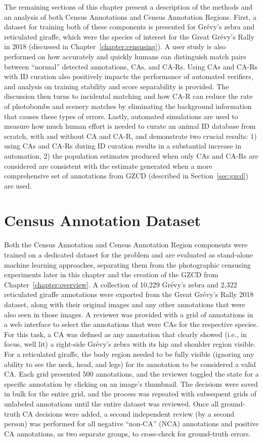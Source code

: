 The remaining sections of this chapter present a description of the methods and an analysis of both Census Annotations and Census Annotation Regions. First, a dataset for training both of these components is presented for Gr\'evy's zebra and reticulated giraffe, which were the species of interest for the Great Gr\'evy's Rally in 2018 (discussed in Chapter~\ref{chapter:censusing}).  A user study is also performed on how accurately and quickly humans can distinguish match pairs between ``normal'' detected annotations, CAs, and CA-Rs.  Using CAs and CA-Rs with ID curation also positively impacts the performance of automated verifiers, and analysis on training stability and score separability is provided.  The discussion then turns to incidental matching and how CA-R can reduce the rate of photobombs and scenery matches by eliminating the background information that causes these types of errors.  Lastly, automated simulations are used to measure how much human effort is needed to curate an animal ID database from scratch, with and without CA and CA-R, and demonstrate two crucial results: 1) using CAs and CA-Rs during ID curation results in a substantial increase in automation, 2) the population estimates produced when only CAs and CA-Rs are considered are consistent with the estimate generated when a more comprehensive set of annotations from GZCD (described in Section~\ref{sec:gzcd}) are used.

\section{Census Annotation Dataset}\label{sec:ca-dataset}

Both the Census Annotation and Census Annotation Region components were trained on a dedicated dataset for the problem and are evaluated as stand-alone machine learning approaches, separating them from the photographic censusing experiments later in this chapter and the creation of the GZCD from Chapter~\ref{chapter:overview}.  A collection of 10,229 Gr\'evy's zebra and 2,322 reticulated giraffe annotations were exported from the Great Gr\'evy's Rally 2018 dataset, along with their original images and any other annotations that were also seen in those images.  A reviewer was provided with a grid of annotations in a web interface to select the annotations that were CAs for the respective species.  For this task, a CA was defined as any annotation that clearly showed (i.e., in focus, well lit) a right-side Gr\'evy's zebra with its hip and shoulder region visible.  For a reticulated giraffe, the body region needed to be fully visible (ignoring any ability to see the neck, head, and legs) for its annotation to be considered a valid CA.  Each grid presented 500 annotations, and the reviewer toggled the state for a specific annotation by clicking on an image's thumbnail.  The decisions were saved in bulk for the entire grid, and the process was repeated with subsequent grids of unlabeled annotations until the entire dataset was reviewed.  Once all ground-truth CA decisions were added, a second independent review (by a second person) was performed for all negative ``non-CA'' (NCA) annotations and positive CA annotations, as two separate groups, to cross-check for ground-truth errors.

